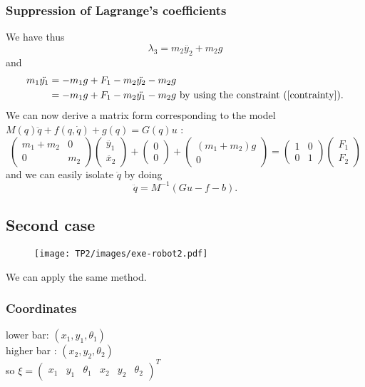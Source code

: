 \subsubsection{Suppression of Lagrange's coefficients}
We have thus $$\lambda_3 =  m_2\ddot{y_2}+m_2g$$
and 
\begin{align*}
m_1\ddot{y_1} &= -m_1g + F_1 - m_2\ddot{y_2} - m_2g \\
&=  -m_1g + F_1 - m_2\ddot{y_1} - m_2g \text{ by using the constraint~(\ref{contrainty})}.
\end{align*}
We can now derive a matrix form corresponding to the model $M(q) \ddot{q} + f(q,\dot{q})+g(q) = G(q)u$ :
$$\left( \begin{array}{cc}
m_1+m_2 & 0\\
0 & m_2
\end{array} \right) \left( \begin{array}{cc}
\ddot{y_1}\\
\ddot{x_2}
\end{array} \right) + \left( \begin{array}{cc}
0\\
0
\end{array} \right) + \left( \begin{array}{cc}
(m_1+m_2)g\\
0
\end{array} \right)
=  \left( \begin{array}{cc}
1 & 0\\
0 & 1
\end{array} \right)  \left( \begin{array}{cc}
F_1\\
F_2
\end{array} \right) $$ and we can easily isolate $\ddot{q}$ by doing
$$\ddot{q} = M^{-1}(Gu-f-b).$$



\subsection{Second case}

\begin{figure}[!h]
\texttt{[image: TP2/images/exe-robot2.pdf]}
\end{figure}

We can apply the same method.

\subsubsection{Coordinates} lower bar: $(x_1, y_1, \theta_1)$ \\
higher bar : $(x_2, y_2, \theta_2)$ \\
so $\xi = \left( \begin{array}{cccccc}
x_1 &  y_1 & \theta_1 & x_2 & y_2 & \theta_2
\end{array} \right)^T$

